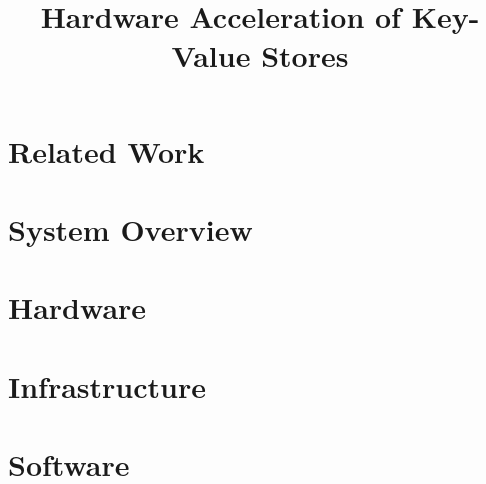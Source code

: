 \documentclass[conference]{IEEEtran}
\title{Hardware Acceleration of Key-Value Stores}
\author{
	\IEEEauthorblockN{Howard Mao}
	\IEEEauthorblockA{\email{zhemao@eecs.berkeley.edu}}
	\and
	\IEEEauthorblockN{Sagar Karandikar}
	\IEEEauthorblockA{\email{skarandikar@berkeley.edu}}
	\and
	\IEEEauthorblockN{Albert Ou}
	\IEEEauthorblockA{\email{aou@eecs.berkeley.edu}}
	\and
	\IEEEauthorblockN{Soumya Basu}
	\IEEEauthorblockA{\email{soumyab@berkeley.edu}}
}
\begin{document}
\maketitle




\section{Related Work}



\section{System Overview}



\section{Hardware}





\section{Infrastructure}



\section{Software}



\nocite{*}
\printbibliography
\end{document}
